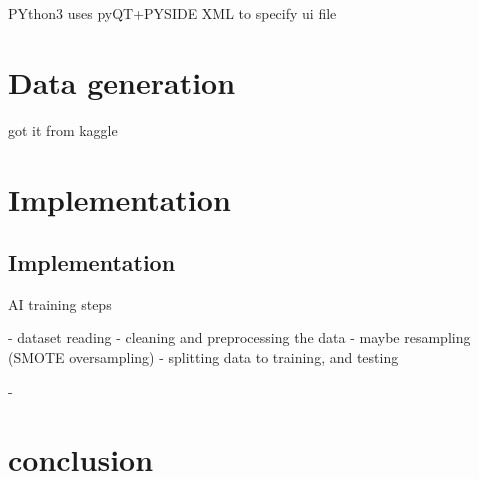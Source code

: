 PYthon3
uses pyQT+PYSIDE
XML to specify ui file













\section{Data generation}
got it from kaggle

\section{Implementation}






\subsection{Implementation}
AI training steps

- dataset reading
- cleaning and preprocessing the data
- maybe resampling (SMOTE oversampling)
- splitting data to training, and testing

- 

\section{conclusion}

